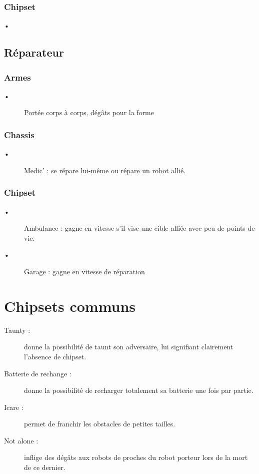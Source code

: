 \documentclass[10pt]{article}
\begin{document}
\subsubsection*{Chipset}
\begin{description}
\item [•] 
\end{description}

\subsection{Réparateur}
\subsubsection*{Armes}
\begin{description}
\item [•] Portée corps à corps, dégâts pour la forme
\end{description}

\subsubsection*{Chassis}
\begin{description}
\item [•] Medic' : se répare lui-même ou répare un robot allié.
\end{description}

\subsubsection*{Chipset}
\begin{description}
\item [•] Ambulance : gagne en vitesse s'il vise une cible alliée avec peu de points de vie.
\item [•] Garage : gagne en vitesse de réparation
\end{description}

\section{Chipsets communs}
\begin{description}
\item [Taunty :] donne la possibilité de taunt son adversaire, lui signifiant clairement l'absence de chipset.
\item [Batterie de rechange :] donne la possibilité de recharger totalement sa batterie une fois par partie.
\item [Icare :] permet de franchir les obstacles de petites tailles.
\item [Not alone :] inflige des dégâts aux robots de proches du robot porteur lors de la mort de ce dernier.
\end{description}
\newpage
\setcounter{section}{0}
\end{document}
